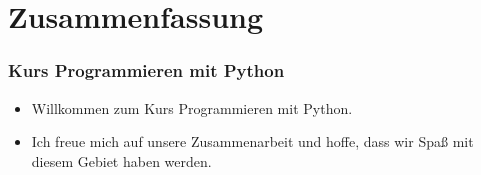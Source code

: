 \documentclass[aspectratio=169,mathserif,notheorems]{beamer}%
\begin{document}
\section{Zusammenfassung}%
%
\begin{frame}\frametitle{Kurs Programmieren mit Python}%
\begin{itemize}%
\item Willkommen zum Kurs \alert{Programmieren mit Python}.%
\item<2-> Ich freue mich auf unsere Zusammenarbeit und hoffe, dass wir Spaß mit diesem Gebiet haben werden.%
\end{itemize}%
\end{frame}%
%
\endPresentation%
\end{document}
